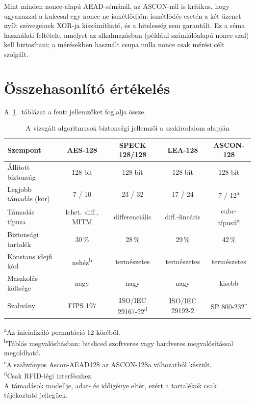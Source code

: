 \documentclass[a4paper,12pt]{report}
\theoremstyle{definition}
\theoremstyle{remark}
\begin{document}
Mint minden nonce-alapú AEAD-sémánál, az ASCON-nál is kritikus, hogy ugyanazzal a kulccsal egy nonce ne ismétlődjön: ismétlődés esetén a két üzenet nyílt szövegeinek XOR-ja kiszámítható, és a hitelesség sem garantált. Ez a séma használati feltétele, amelyet az alkalmazásban (például számlálóalapú nonce-szal) kell biztosítani; a mérésekben használt csupa nulla nonce csak mérési célt szolgált.

\section{Összehasonlító értékelés}\label{sec:security_compare}

A~\ref{table:security_compare}.~táblázat a fenti jellemzőket foglalja össze.

\begin{table}[h!]
\centering
\caption{A vizsgált algoritmusok biztonsági jellemzői a szakirodalom alapján}
\label{table:security_compare}
\footnotesize
\vspace{.2 cm}
\setlength{\tabcolsep}{3.5pt}
\begin{tabular}{lcccc}
\hline
\textbf{Szempont} & \textbf{AES-128} & \textbf{SPECK 128/128} & \textbf{LEA-128} & \textbf{ASCON-128} \\
\hline
Állított biztonság & 128 bit & 128 bit & 128 bit & 128 bit \\
Legjobb támadás (kör) & 7 / 10 & 23 / 32 & 17 / 24 & 7 / 12\textsuperscript{a} \\
Támadás típusa & lehet.\ diff., MITM & differenciális & diff.-lineáris & cube-típusú\textsuperscript{a} \\
Biztonsági tartalék & 30\,\% & 28\,\% & 29\,\% & 42\,\% \\
Konstans idejű kód & nehéz\textsuperscript{b} & természetes & természetes & természetes \\
Maszkolás költsége & nagy & nagy & nagy & kisebb \\
Szabvány & FIPS 197 & ISO/IEC 29167-22\textsuperscript{d} & ISO/IEC 29192-2 & SP 800-232\textsuperscript{c} \\
\hline
\end{tabular}
\begin{flushleft}
\footnotesize
\textsuperscript{a}Az inicializáló permutáció 12 köréből.\\
\textsuperscript{b}Táblás megvalósításban; bitsliced szoftveres vagy hardveres megvalósítással megoldható.\\
\textsuperscript{c}A szabványos Ascon-AEAD128 az ASCON-128a változatból készült.\\
\textsuperscript{d}Csak RFID-légi interfészhez.\\
A támadások modellje, adat- és időigénye eltér, ezért a tartalékok csak tájékoztató jellegűek.
\end{flushleft}
\end{table}
\end{document}
